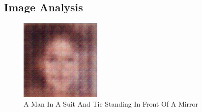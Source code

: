 \documentclass{article}%
\begin{document}
%
\subsection{Image Analysis}%
\label{subsec:ImageAnalysis}%


\begin{figure}[h!]%
\centering%
\includegraphics[width=150px]{500_fake_images/samples_5_156.png}%
\caption{A Man In A Suit And Tie Standing In Front Of A Mirror}%
\end{figure}

%
\end{document}
